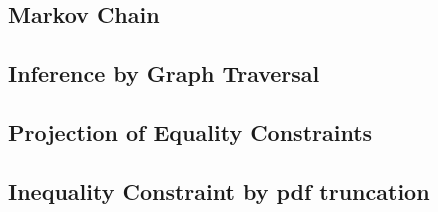 \documentclass{article}
\begin{document}
\subsection{Markov Chain}\label{Sec:Markov}

\subsection{Inference by Graph Traversal}\label{Sec:Graph}

\subsection{Projection of Equality Constraints}\label{Sec:EqConstraint}

\subsection{Inequality Constraint by \gls{pdf} truncation}\label{Sec:IneqConstraint}
\end{document}

